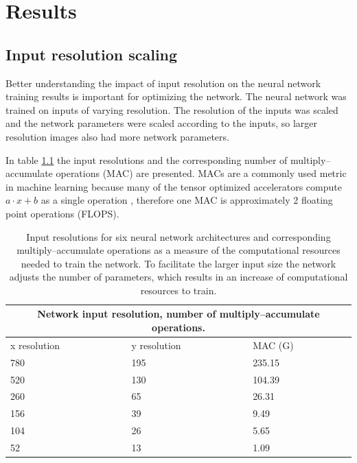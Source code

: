 %
\chapter{Results}
\label{sec:results}

\section{Input resolution scaling}

Better understanding the impact of input resolution on the neural network training results is important for optimizing the network. The neural network was trained on inputs of varying resolution. The resolution of the inputs was scaled and the network parameters were scaled according to the inputs, so larger resolution images also had more network parameters.

In table \ref{table:input} the input resolutions and the corresponding number of multiply–accumulate operations (MAC) are presented. MACs are a commonly used metric in machine learning because many of the tensor optimized accelerators compute $a \cdot x+b$ as a single operation \cite{nvidia_technical_blog_2022}, therefore one MAC is approximately 2 floating point operations (FLOPS).

\begin{table}
    \begin{tabular}{ |p{3cm}|p{3cm}|p{4cm}|  }
        \hline
        \multicolumn{3}{|c|}{Network input resolution, number of multiply–accumulate operations.} \\
        \hline
        x resolution & y resolution & MAC (G)                                                     \\
        \hline
        780          & 195          & 235.15                                                      \\
        520          & 130          & 104.39                                                      \\
        260          & 65           & 26.31                                                       \\
        156          & 39           & 9.49                                                        \\
        104          & 26           & 5.65                                                        \\
        52           & 13           & 1.09                                                        \\
        \hline
    \end{tabular}
    \caption{Input resolutions for six neural network architectures and corresponding multiply–accumulate operations as a measure of the computational resources needed to train the network. To facilitate the larger input size the network adjusts the number of parameters, which results in an increase of computational resources to train.}
    \label{table:input}
\end{table}

